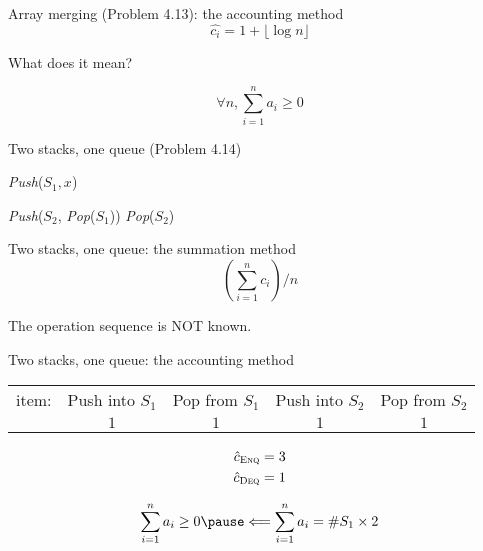 \begin{frame}{Array merging (Problem 4.13): the accounting method}
  \[
	\hat{c_i} = 1 + \lfloor \log n \rfloor
  \]

  \pause
  \vspace{0.60cm}
  \centerline{What does it mean?}

  \pause
  \vspace{0.80cm}
  \[
	\forall n, \sum_{i=1}^{n} a_i \geq 0
  \]
\end{frame}
\begin{frame}{Two stacks, one queue (Problem 4.14)}
  \begin{algorithm}[H]
    \caption{Simulating a queue using two stacks $S_1, S_2$.}
    \begin{algorithmic}[]
		\State \textsl{Push}($S_1, x$)
      \EndProcedure

	  \Statex

            \State \textsl{Push}($S_2$, \textsl{Pop}($S_1$))
          \EndWhile
        \EndIf
        \textsl{Pop}($S_2$)
      \EndProcedure
    \end{algorithmic}
  \end{algorithm}
\end{frame}
\begin{frame}{Two stacks, one queue: the summation method}
  \[
	(\sum_{i = 1}^{n} c_i) / n
  \]

  \pause
  \centerline{The operation sequence is NOT known.}
\end{frame}
\begin{frame}{Two stacks, one queue: the accounting method}
  \begin{table}
    \begin{tabular}{ccccc}
	  item: & Push into $S_1$ & Pop from $S_1$ & Push into $S_2$ & Pop from $S_2$ \\
	  & $1$ & $1$ & $1$ & $1$
    \end{tabular}
  \end{table}


  \pause
  \begin{align*}
	\hat{c}_{\textsc{Enq}} &= 3 \\
	\hat{c}_{\textsc{Deq}} &= 1 \\
  \end{align*}

  \pause
  \[ 
    \sum_{i=1}^{n} a_i \ge 0 \pause \Longleftarrow \sum_{i=1}^{n} a_i = \#S_1 \times 2
  \]
\end{frame}

